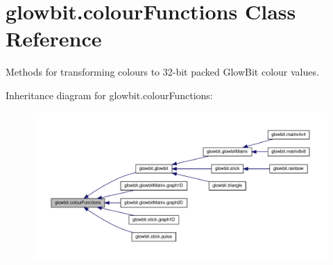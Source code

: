 \hypertarget{classglowbit_1_1colourFunctions}{}\section{glowbit.\+colour\+Functions Class Reference}
\label{classglowbit_1_1colourFunctions}


Methods for transforming colours to 32-\/bit packed Glow\+Bit colour values.  




Inheritance diagram for glowbit.\+colour\+Functions\+:\nopagebreak
\begin{figure}[H]
\begin{center}
\leavevmode
\includegraphics[width=350pt]{classglowbit_1_1colourFunctions__inherit__graph}
\end{center}
\end{figure}
